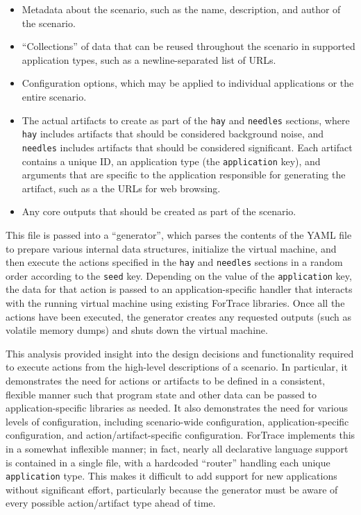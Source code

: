 \documentclass[letterpaper,12pt]{report}
\def\tightlist{}
\newcommand{\passthrough}[1]{#1}
\begin{document}
\begin{itemize}
\tightlist
\item
  Metadata about the scenario, such as the name, description, and author
  of the scenario.
\item
  ``Collections'' of data that can be reused throughout the scenario in
  supported application types, such as a newline-separated list of URLs.
\item
  Configuration options, which may be applied to individual applications
  or the entire scenario.
\item
  The actual artifacts to create as part of the
  \passthrough{\lstinline!hay!} and \passthrough{\lstinline!needles!}
  sections, where \passthrough{\lstinline!hay!} includes artifacts that
  should be considered background noise, and
  \passthrough{\lstinline!needles!} includes artifacts that should be
  considered significant. Each artifact contains a unique ID, an
  application type (the \passthrough{\lstinline!application!} key), and
  arguments that are specific to the application responsible for
  generating the artifact, such as a the URLs for web browsing.\\
\item
  Any core outputs that should be created as part of the scenario.
\end{itemize}

This file is passed into a ``generator'', which parses the contents of
the YAML file to prepare various internal data structures, initialize
the virtual machine, and then execute the actions specified in the
\passthrough{\lstinline!hay!} and \passthrough{\lstinline!needles!}
sections in a random order according to the
\passthrough{\lstinline!seed!} key. Depending on the value of the
\passthrough{\lstinline!application!} key, the data for that action is
passed to an application-specific handler that interacts with the
running virtual machine using existing ForTrace libraries. Once all the
actions have been executed, the generator creates any requested outputs
(such as volatile memory dumps) and shuts down the virtual machine.

This analysis provided insight into the design decisions and
functionality required to execute actions from the high-level
descriptions of a scenario. In particular, it demonstrates the need for
actions or artifacts to be defined in a consistent, flexible manner such
that program state and other data can be passed to application-specific
libraries as needed. It also demonstrates the need for various levels of
configuration, including scenario-wide configuration,
application-specific configuration, and action/artifact-specific
configuration. ForTrace implements this in a somewhat inflexible manner;
in fact, nearly all declarative language support is contained in a
single file, with a hardcoded ``router'' handling each unique
\passthrough{\lstinline!application!} type. This makes it difficult to
add support for new applications without significant effort,
particularly because the generator must be aware of every possible
action/artifact type ahead of time.
\end{document}
